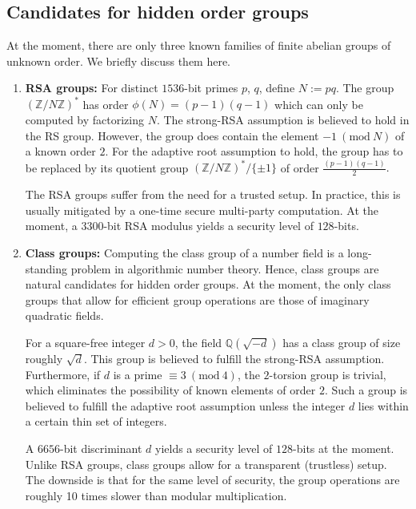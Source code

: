 \documentclass[11pt, lettersize, notitlepage, leqno, footskip=0.6cm]{article}
\newcommand{\bz}{\mathbb Z}
\newcommand{\bq}{\mathbb Q}
\newcommand{\Mod}[1]{\ (\mathrm{mod}\ #1)}
\numberwithin{equation}{section}
\begin{document}
\subsection{\fontsize{11}{11}\selectfont Candidates for hidden order groups }

At the moment, there are only three known families of finite abelian groups of unknown order. We briefly discuss them here.\vspace{0.2cm} \begin{enumerate}[wide, labelwidth=!, labelindent=0pt]

\item \textbf{RSA groups:} For distinct $1536$-bit primes $p$, $q$, define $N:= pq$. The group $(\bz/N\bz)^*$ has order $\phi(N) = (p-1)(q-1)$ which can only be computed by factorizing $N$. The strong-RSA assumption is believed to hold in the RS group. However, the group does contain the element $-1\Mod{N}$ of a known order $2$. For the adaptive root assumption to hold, the group has to be replaced by its quotient group $(\bz/N\bz)^*/\{\pm 1\}$ of order $\frac{(p-1)(q-1)}{2}.$ 

The RSA groups suffer from the need for a trusted setup. In practice, this is usually mitigated by a one-time secure multi-party computation. At the moment, a $3300$-bit RSA modulus yields a security level of $128$-bits.\vspace{0.15cm}


\item \textbf{Class groups:} Computing the class group of a number field is a long-standing problem in algorithmic number theory. Hence, class groups are natural candidates for hidden order groups. At the moment, the only class groups that allow for efficient group operations are those of imaginary quadratic fields.

For a square-free integer $d > 0$, the field $\bq(\sqrt{-d})$ has a class group of size roughly $\sqrt{d}$. This group is believed to fulfill the strong-RSA assumption. Furthermore, if $d$ is a prime $\equiv 3 \Mod{4}$, the $2$-torsion group is trivial, which eliminates the possibility of known elements of order $2$. Such a group is believed to fulfill the adaptive root assumption unless the integer $d$ lies within a certain thin set of integers.

A $6656$-bit discriminant $d$ yields a security level of $128$-bits at the moment. Unlike RSA groups, class groups allow for a transparent (trustless) setup. The downside is that for the same level of security, the group operations are roughly 10 times slower than modular multiplication.\vspace{0.15cm}


\end{enumerate}
\end{document}
